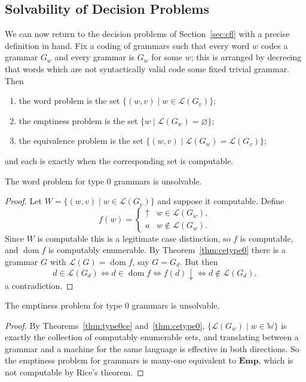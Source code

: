 \documentclass[a4paper]{scrartcl}
\newcommand{\WW}{\mathbb{W}}
\newcommand{\dom}{\operatorname{dom}}
\newcommand{\lang}{\mathcal{L}}
\newcommand{\Emp}{\mathbf{Emp}}
\begin{document}
\subsection{Solvability of Decision Problems}\label{sec:solvability}

We can now return to the decision problems of Section~\ref{sec:cfl} with a precise definition in hand. Fix a coding of grammars such that every word $w$ codes a grammar $G_w$ and every grammar is $G_w$ for some $w$; this is arranged by decreeing that words which are not syntactically valid code some fixed trivial grammar. Then
\begin{enumerate}[label=(\roman*)]
	\item the word problem is the set $\{(w,v) \mid w \in \lang(G_v)\}$;
	\item the emptiness problem is the set $\{w \mid \lang(G_w) = \varnothing\}$;
	\item the equivalence problem is the set $\{(w,v)\mid \lang(G_w) = \lang(G_v)\}$;
\end{enumerate}
and each is  exactly when the corresponding set is computable.

\begin{theorem}
	The word problem for type $0$ grammars is unsolvable.
\end{theorem}

\begin{proof}
	Let $W = \{(w,v)\mid w \in \lang(G_v)\}$ and suppose it computable. Define
	$$f(w) = \begin{cases}\uparrow & w \in \lang(G_w), \\ a & w\notin\lang(G_w).\end{cases}$$
	Since $W$ is computable this is a legitimate case distinction, so $f$ is computable, and $\dom f$ is computably enumerable. By Theorem~\ref{thm:cetype0} there is a grammar $G$ with $\lang(G) = \dom f$, say $G = G_d$. But then
	$$d \in \lang(G_d) \iff d \in \dom f \iff f(d)\!\downarrow \iff d \notin \lang(G_d),$$
	a contradiction.
\end{proof}

\begin{corollary}
	The emptiness problem for type $0$ grammars is unsolvable.
\end{corollary}

\begin{proof}
	By Theorems~\ref{thm:type0ce} and~\ref{thm:cetype0}, $\{\lang(G_w) \mid w\in\WW\}$ is exactly the collection of computably enumerable sets, and translating between a grammar and a machine for the same language is effective in both directions. So the emptiness problem for grammars is many-one equivalent to $\Emp$, which is not computable by Rice's theorem.
\end{proof}
\end{document}
